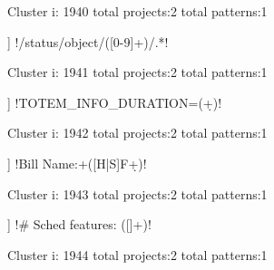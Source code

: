 Cluster i: 1940
total projects:2
total patterns:1
\begin{multicols}{1}
\begin{description}[noitemsep,topsep=0pt]
\item [[2] ] \cverb!/status/object/([0-9]+)/.*!
\end{description}
\end{multicols}







Cluster i: 1941
total projects:2
total patterns:1
\begin{multicols}{1}
\begin{description}[noitemsep,topsep=0pt]
\item [[2] ] \cverb!TOTEM_INFO_DURATION=(\d+)!
\end{description}
\end{multicols}







Cluster i: 1942
total projects:2
total patterns:1
\begin{multicols}{1}
\begin{description}[noitemsep,topsep=0pt]
\item [[2] ] \cverb!Bill Name:\s+([H|S]F\d+)!
\end{description}
\end{multicols}







Cluster i: 1943
total projects:2
total patterns:1
\begin{multicols}{1}
\begin{description}[noitemsep,topsep=0pt]
\item [[2] ] \cverb!# Sched features: ([\w]+)!
\end{description}
\end{multicols}







Cluster i: 1944
total projects:2
total patterns:1
\begin{multicols}{1}
\end{multicols}







